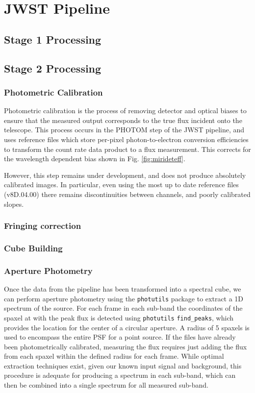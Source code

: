 \section{JWST Pipeline}
\cite{Bushouse2015} %
\cite{Labiano-Ortega2016} %
\subsection{Stage 1 Processing}

\subsection{Stage 2 Processing}
\subsubsection{Photometric Calibration}
Photometric calibration is the process of removing detector and optical biases to ensure that the measured output corresponds to the true flux incident onto the telescope.
This process occurs in the PHOTOM step of the JWST pipeline, and uses reference files which store per-pixel photon-to-electron conversion efficiencies to transform the count rate data product to a flux measurement.
This corrects for the wavelength dependent bias shown in Fig. \ref{fig:mirideteff}.

However, this step remains under development, and does not produce absolutely calibrated images. In particular, even using the most up to date reference files (v8D.04.00) there remains discontinuities between channels, and poorly calibrated slopes.
\subsubsection{Fringing correction}
\cite{Carnall2017} %
\subsubsection{Cube Building}
\subsubsection{Aperture Photometry}
Once the data from the pipeline has been transformed into a spectral cube, we can perform aperture photometry using the \verb|photutils| package to extract a 1D spectrum of the source.
For each frame in each sub-band the coordinates of the spaxel at with the peak flux is detected using \verb|photutils| \verb|find_peaks|, which provides the location for the center of a circular aperture.
A radius of 5 spaxels is used to encompass the entire PSF for a point source.
If the files have already been photometrically calibrated, measuring the flux requires just adding the flux from each spaxel within the defined radius for each frame.
While optimal extraction techniques exist, given our known input signal and background, this procedure is adequate for producing a spectrum in each sub-band, which can then be combined into a single spectrum for all measured sub-band.

